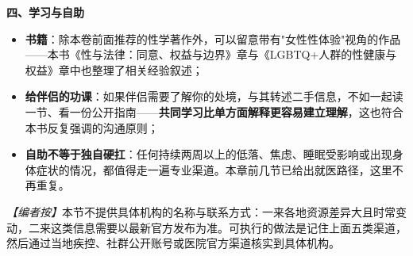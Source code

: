 \textbf{四、学习与自助}
\begin{itemize}
\item \textbf{书籍}：除本卷前面推荐的性学著作外，可以留意带有"女性性体验"视角的作品——本书《性与法律：同意、权益与边界》章与《LGBTQ+人群的性健康与权益》章中也整理了相关经验叙述；
\item \textbf{给伴侣的功课}：如果伴侣需要了解你的处境，与其转述二手信息，不如一起读一节、看一份公开指南——\textbf{共同学习比单方面解释更容易建立理解}，这也符合本书反复强调的沟通原则；
\item \textbf{自助不等于独自硬扛}：任何持续两周以上的低落、焦虑、睡眠受影响或出现身体症状的情况，都值得走一遍专业渠道。本章前几节已给出就医路径，这里不再重复。
\end{itemize}

\noindent\textit{【编者按】}本节不提供具体机构的名称与联系方式：一来各地资源差异大且时常变动，二来这类信息需要以最新官方发布为准。可执行的做法是记住上面五类渠道，然后通过当地疾控、社群公开账号或医院官方渠道核实到具体机构。
